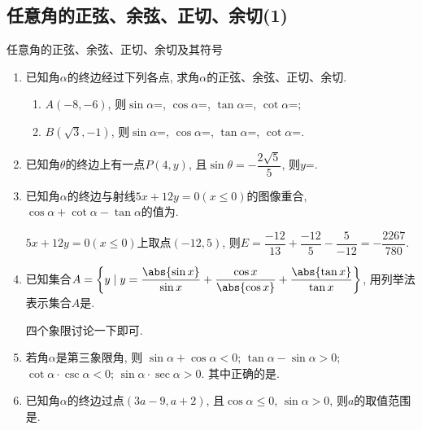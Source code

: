 \subsection{任意角的正弦、余弦、正切、余切(1)}
\zsd 任意角的正弦、余弦、正切、余切及其符号

\begin{enumerate}

\item 已知角$\alpha$的终边经过下列各点, 求角$\alpha$的正弦、余弦、正切、余切. 
\begin{enumerate}[(1)]
\item $A(-8,-6)$,     则$\sin\alpha$=, $\cos\alpha$=, $\tan\alpha$=, $\cot\alpha$=; 
\item $B(\sqrt3,-1)$, 则$\sin\alpha$=, $\cos\alpha$=, $\tan\alpha$=, $\cot\alpha$=. 
\end{enumerate}

\item 已知角$\theta$的终边上有一点$P(4,y)$, 且$\sin\theta=-\dfrac{2\sqrt{5}}{5}$, 则$y$=. 

\item 已知角$\alpha$的终边与射线$5x+12y=0(x\leq 0)$的图像重合, $\cos\alpha+\cot\alpha-\tan\alpha$的值为. 
\begin{jieda}
$5x+12y=0(x\leq 0)$上取点$(-12,5)$, 
则$E=\dfrac{-12}{13}+\dfrac{-12}{5}-\dfrac{5}{-12}=-\dfrac{2267}{780}$. 
\end{jieda}

\item 已知集合$A=\left\{y\mid y=\dfrac{\abs{\sin{x}}}{\sin{x}}+\dfrac{\cos{x}}{\abs{\cos{x}}}+\dfrac{\abs{\tan{x}}}{\tan{x}}\right\}$, 
用列举法表示集合$A$是. 
\begin{jieda}
四个象限讨论一下即可. 
\end{jieda}


\item 若角$\alpha$是第三象限角, 则
 $\sin\alpha+\cos\alpha<0$; 
 $\tan\alpha-\sin\alpha>0$; 
 $\cot\alpha\cdot\csc\alpha<0$; 
 $\sin\alpha\cdot\sec\alpha>0$. 
其中正确的是.  

\item 已知角$\alpha$的终边过点$(3a-9,a+2)$, 且$\cos\alpha\leq 0$, $\sin\alpha>0$, 则$a$的取值范围是\blkda{$(-2,3]$}. 


\end{enumerate}
